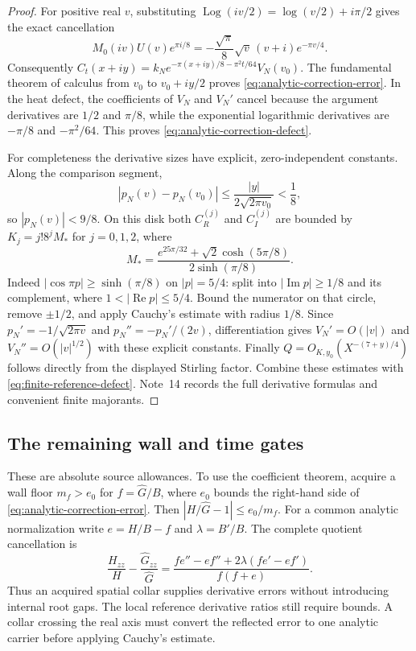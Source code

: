 \begin{proof}
For positive real $v$, substituting
$\operatorname{Log}(iv/2)=\log(v/2)+i\pi/2$ gives the exact cancellation
\[
 M_0(iv)U(v)e^{\pi i/8}
       =-\frac{\sqrt\pi}{8}\sqrt v\,(v+i)e^{-\pi v/4}.
\]
Consequently
$C_t(x+iy)=k_Ne^{-\pi(x+iy)/8-\pi^2t/64}V_N(v_0)$.
The fundamental theorem of calculus from $v_0$ to $v_0+iy/2$ proves
\eqref{eq:analytic-correction-error}. In the heat defect, the coefficients of
$V_N$ and $V_N'$ cancel because the argument derivatives are $1/2$ and
$\pi/8$, while the exponential logarithmic derivatives are $-\pi/8$ and
$-\pi^2/64$. This proves \eqref{eq:analytic-correction-defect}.

For completeness the derivative sizes have explicit, zero-independent
constants. Along the comparison segment,
\[
 |p_N(v)-p_N(v_0)|\le\frac{|y|}{2\sqrt{2\pi v_0}}<\frac18,
\]
so $|p_N(v)|<9/8$. On this disk both $C_R^{(j)}$ and $C_I^{(j)}$ are bounded
by $K_j=j!8^jM_*$ for $j=0,1,2$, where
\[
 M_*=\frac{e^{25\pi/32}+\sqrt2\cosh(5\pi/8)}{2\sinh(\pi/8)}.
\]
Indeed $|\cos\pi p|\ge\sinh(\pi/8)$ on $|p|=5/4$: split into
$|\operatorname{Im}p|\ge1/8$ and its complement, where
$1<|\operatorname{Re}p|\le5/4$. Bound the numerator on that circle, remove
$\pm1/2$, and apply Cauchy's estimate with radius $1/8$.
Since $p_N'=-1/\sqrt{2\pi v}$ and $p_N''=-p_N'/(2v)$, differentiation gives
$V_N'=O(|v|)$ and $V_N''=O(|v|^{1/2})$ with these explicit constants.
Finally $Q=O_{K,y_0}(X^{-(7+y)/4})$ follows directly from the displayed
Stirling factor. Combine these estimates with
\eqref{eq:finite-reference-defect}. Note~14 records the full derivative
formulas and convenient finite majorants.
\end{proof}

\subsection{The remaining wall and time gates}

These are absolute source allowances. To use the coefficient theorem, acquire
a wall floor $m_f>e_0$ for $f=\widehat G/B$, where $e_0$ bounds the
right-hand side of \eqref{eq:analytic-correction-error}. Then
$|H/\widehat G-1|\le e_0/m_f$. For a common analytic normalization write
$e=H/B-f$ and $\lambda=B'/B$. The complete quotient cancellation is
\[
 \frac{H_{zz}}H-\frac{\widehat G_{zz}}{\widehat G}
 =\frac{fe''-ef''+2\lambda(fe'-ef')}{f(f+e)}.
\]
Thus an acquired spatial collar supplies derivative errors without introducing
internal root gaps. The local reference derivative ratios still require
bounds. A collar crossing the real axis must convert the reflected error to
one analytic carrier before applying Cauchy's estimate.

